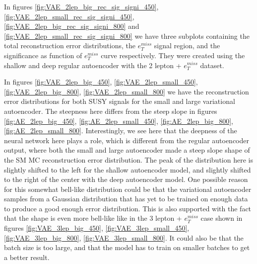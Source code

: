 In figures \ref{fig:VAE_2lep_big_rec_sig_signi_450}, \ref{fig:VAE_2lep_small_rec_sig_signi_450}, 
\ref{fig:VAE_2lep_big_rec_sig_signi_800} and \ref{fig:VAE_2lep_small_rec_sig_signi_800} we have three 
subplots containing the total reconstruction error distributions, the $e_T^{miss}$ signal region, 
and the significance as function of $e_T^{miss}$ curve respectively. They were created using 
the shallow and deep regular autoencoder with the 2 lepton + $e_T^{miss}$ dataset. \par
In figures \ref{fig:VAE_2lep_big_450}, \ref{fig:VAE_2lep_small_450}, \ref{fig:VAE_2lep_big_800}, 
\ref{fig:VAE_2lep_small_800} we have the reconstruction error distributions 
for both SUSY signals for the small and large variational autoencoder. 
The steepness here differs from the steep slope in figures 
\ref{fig:AE_2lep_big_450}, \ref{fig:AE_2lep_small_450}, \ref{fig:AE_2lep_big_800}, 
\ref{fig:AE_2lep_small_800}. Interestingly, we see here that the deepness of the neural 
network here plays a role, which is different from the regular autoencoder output, where both 
the small and large autoencoder made a steep slope shape of the SM MC reconstruction error 
distribution. The peak of the distribution here is slightly shifted to the left for the shallow 
autoencoder model, and slightly shifted to the right of the center with the deep autoencoder 
model. One possible reason for this somewhat bell-like distribution could be that the 
variational autoencoder samples from a Gaussian distribution that has yet to be trained on 
enough data to produce a good enough error distribution. This is also supported with the fact 
that the shape is even more bell-like like in the 3 lepton + $e_T^{miss}$ case shown in 
figures \ref{fig:VAE_3lep_big_450}, \ref{fig:VAE_3lep_small_450}, \ref{fig:VAE_3lep_big_800}, 
\ref{fig:VAE_3lep_small_800}. It could also be that the batch size is too large, and that 
the model has to train on smaller batches to get a better result. \par 

